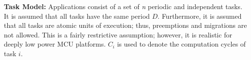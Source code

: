 \noindent\textbf{Task Model: }Applications consist of a set of \textit{n} periodic and independent tasks. It is assumed that all tasks have the same period $D$. Furthermore, it is assumed that all tasks are atomic units of execution; thus, preemptions and migrations are not allowed. This is a fairly restrictive assumption; however, it is realistic for deeply low power MCU platforms. $C_i$ is used to denote the computation cycles of task $i$.




